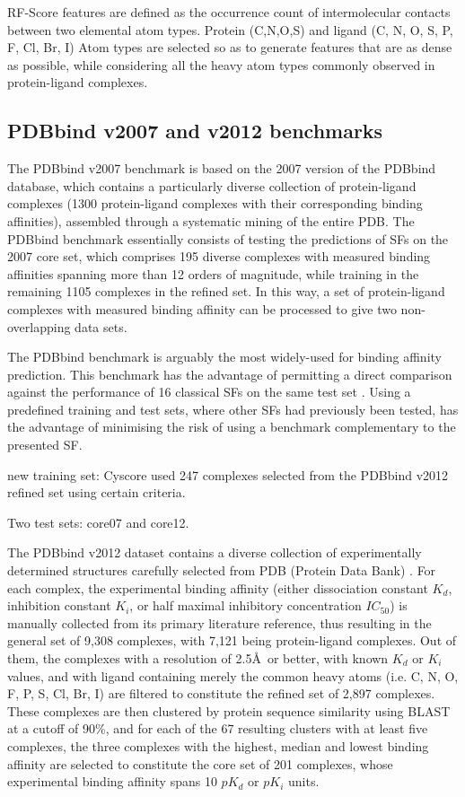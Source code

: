 \documentclass[journal=jacsat,manuscript=article]{achemso}
\begin{document}
RF-Score features are defined as the occurrence count of intermolecular contacts between two elemental atom types. Protein (C,N,O,S) and ligand (C, N, O, S, P, F, Cl, Br, I) Atom types are selected so as to generate features that are as dense as possible, while considering all the heavy atom types commonly observed in protein-ligand complexes.

\subsection{PDBbind v2007 and v2012 benchmarks}

The PDBbind v2007 benchmark is based on the 2007 version of the PDBbind database, which contains a particularly diverse collection of protein-ligand complexes (1300 protein-ligand complexes with their corresponding binding affinities), assembled through a systematic mining of the entire PDB. The PDBbind benchmark essentially consists of testing the predictions of SFs on the 2007 core set, which comprises 195 diverse complexes with measured binding affinities spanning more than 12 orders of magnitude, while training in the remaining 1105 complexes in the refined set. In this way, a set of protein-ligand complexes with measured binding affinity can be processed to give two non-overlapping data sets.

The PDBbind benchmark is arguably the most widely-used for binding affinity prediction. This benchmark has the advantage of permitting a direct comparison against the performance of 16 classical SFs on the same test set \cite{1313}. Using a predefined training and test sets, where other SFs had previously been tested, has the advantage of minimising the risk of using a benchmark complementary to the presented SF.

new training set: Cyscore used 247 complexes selected from the PDBbind v2012 refined set using certain criteria.

Two test sets: core07 and core12.

The PDBbind v2012 dataset contains a diverse collection of experimentally determined structures carefully selected from PDB (Protein Data Bank) \cite{540,537}. For each complex, the experimental binding affinity (either dissociation constant $K_d$, inhibition constant $K_i$, or half maximal inhibitory concentration $IC_{50}$) is manually collected from its primary literature reference, thus resulting in the general set of 9,308 complexes, with 7,121 being protein-ligand complexes. Out of them, the complexes with a resolution of 2.5\AA\ or better, with known $K_d$ or $K_i$ values, and with ligand containing merely the common heavy atoms (i.e. C, N, O, F, P, S, Cl, Br, I) are filtered to constitute the refined set of 2,897 complexes. These complexes are then clustered by protein sequence similarity using BLAST at a cutoff of 90\%, and for each of the 67 resulting clusters with at least five complexes, the three complexes with the highest, median and lowest binding affinity are selected to constitute the core set of 201 complexes, whose experimental binding affinity spans 10 $pK_d$ or $pK_i$ units.
\end{document}
